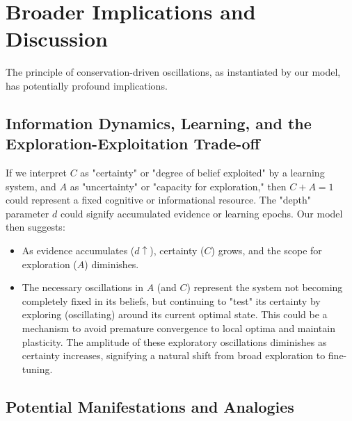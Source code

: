 \documentclass[11pt,a4paper]{article}
\begin{document}
\section{Broader Implications and Discussion}

The principle of conservation-driven oscillations, as instantiated by our model, has potentially profound implications.

\subsection{Information Dynamics, Learning, and the Exploration-Exploitation Trade-off}

If we interpret $C$ as "certainty" or "degree of belief exploited" by a learning system, and $A$ as "uncertainty" or "capacity for exploration," then $C+A=1$ could represent a fixed cognitive or informational resource. The "depth" parameter $d$ could signify accumulated evidence or learning epochs. Our model then suggests:
\begin{itemize}
    \item As evidence accumulates ($d \uparrow$), certainty ($C$) grows, and the scope for exploration ($A$) diminishes.
    \item The necessary oscillations in $A$ (and $C$) represent the system not becoming completely fixed in its beliefs, but continuing to "test" its certainty by exploring (oscillating) around its current optimal state. This could be a mechanism to avoid premature convergence to local optima and maintain plasticity. The amplitude of these exploratory oscillations diminishes as certainty increases, signifying a natural shift from broad exploration to fine-tuning.
\end{itemize}

\subsection{Potential Manifestations and Analogies}
\end{document}
